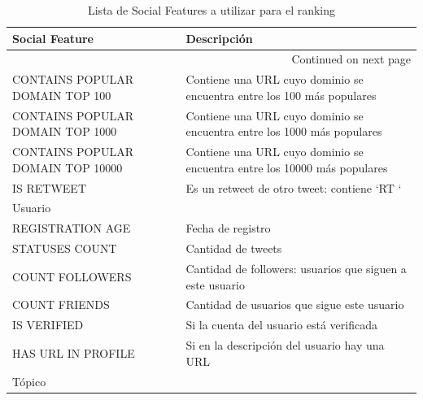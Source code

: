 \documentclass[11pt,letterpaper]{article}
\begin{document}
   \begingroup
   \fontsize{8pt}{10pt}\selectfont

\begin{longtable}{|l|l|}
\caption{\label{tab:features}Lista de Social Features a utilizar para el ranking}\\
\hline
 \textbf{Social Feature}            &  \textbf{Descripción}                                                     \\
\hline
\endhead
\hline\multicolumn{2}{r}{Continued on next page}\
\endfoot
\endlastfoot
\hline
\hline
 Tweet                              &                                                                            \\
\hline
\hline
 CONTAINS POPULAR DOMAIN TOP 100    &  Contiene una URL cuyo dominio se encuentra entre los 100 más populares    \\
 CONTAINS POPULAR DOMAIN TOP 1000   &  Contiene una URL cuyo dominio se encuentra entre los 1000 más populares   \\
 CONTAINS POPULAR DOMAIN TOP 10000  &  Contiene una URL cuyo dominio se encuentra entre los 10000 más populares  \\
 IS RETWEET                         &  Es un retweet de otro tweet: contiene `RT `                               \\
\hline
\hline
 Usuario                            &                                                                            \\
\hline
\hline
 REGISTRATION AGE                   &  Fecha de registro                                                         \\
 STATUSES COUNT                     &  Cantidad de tweets                                                        \\
 COUNT FOLLOWERS                    &  Cantidad de followers: usuarios que siguen a este usuario                 \\
 COUNT FRIENDS                      &  Cantidad de usuarios que sigue este usuario                               \\
 IS VERIFIED                        &  Si la cuenta del usuario está verificada                                  \\
 HAS URL IN PROFILE                 &  Si en la descripción del usuario hay una URL                              \\
\hline
\hline
 Tópico                             &                                                                            \\

\end{longtable}
\end{document}
